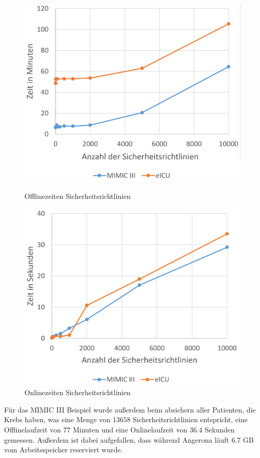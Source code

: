 \documentclass[german,version-2020-11]{uzl-thesis}
\begin{document}
	\begin{figure}[ht]
	\begin{minipage}{.5\textwidth}
		\centering
		\includegraphics[width=0.9\linewidth]{assets/OfflineEicuMimic.png}
		\caption{Offlinezeiten Sicherheitsrichtlinien}
		\label{fig:offlinesecures}
	\end{minipage}
	\begin{minipage}{.5\textwidth}
		\centering
		\includegraphics[width=0.9\linewidth]{assets/onlineEicuMimic.png}
		\caption{Onlinezeiten Sicherheitsrichtlinien}
		\label{fig:onlinesecures}
	\end{minipage}
\end{figure}
Für das MIMIC III Beispiel wurde außerdem beim absichern aller Patienten, die Krebs haben, was eine Menge von $13658$ Sicherheitsrichtlinien entspricht, eine Offlinelaufzeit von $77$ Minuten und eine Onlinelaufzeit von $36.4$ Sekunden gemessen. Außerdem ist dabei aufgefallen, dass während Angerona läuft $6.7$ GB vom Arbeitsspeicher reserviert wurde. \\ 
\end{document}
